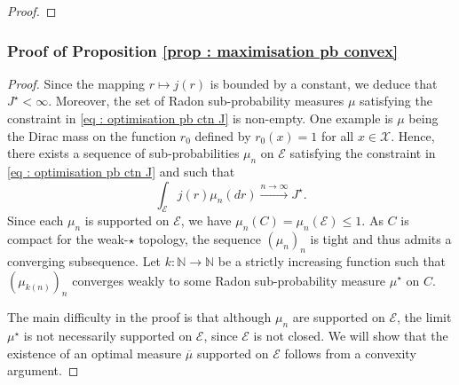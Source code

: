 \documentclass[a4paper, 11pt]{article}
\theoremstyle{definition}
\newcommand{\cX}{{\mathcal{X}}}
\newcommand{\theconvex}{C}
\begin{document}
{\begin{proof}
\end{proof}



\subsubsection{Proof of Proposition \ref{prop : maximisation pb convex}}
\begin{proof}
Since the mapping $r \mapsto j(r)$ is bounded by a constant, we deduce that $J^\star < \infty$. Moreover, the set of Radon sub-probability measures $\mu$ satisfying the constraint in \eqref{eq : optimisation pb ctn J} is non-empty. One example is $\mu$ being the Dirac mass on the function $r_0$ defined by $r_0(x)=1$ for all $x\in \cX$. 
Hence, there exists a sequence of sub-probabilities $\mu_n$ on $\mathcal{E}$ satisfying the constraint in \eqref{eq : optimisation pb ctn J} and such that
\[
\int_\mathcal{E} j(r) \mu_n(dr) \xrightarrow{n \to \infty} J^\star.
\]
Since each $\mu_n$ is supported on $\mathcal{E}$, we have $\mu_n(\theconvex) = \mu_n(\mathcal{E}) \leq 1$. As $\theconvex$ is compact for the weak-$\star$ topology, the sequence $(\mu_n)_n$ is tight and thus admits a converging subsequence. Let $k : \mathbb{N} \to \mathbb{N}$ be a strictly increasing function such that $(\mu_{k(n)})_n$ converges weakly to some Radon sub-probability measure $\mu^\star$ on $\theconvex$.


The main difficulty in the proof is that although $\mu_n$ are supported on $\mathcal{E}$, the limit $\mu^\star$ is not necessarily supported on $\mathcal{E}$, since $\mathcal{E}$ is not closed. We will show that the existence of an optimal measure $\overline{\mu}$ supported on $\mathcal{E}$ follows from a convexity argument.



\end{proof}}
\end{document}
